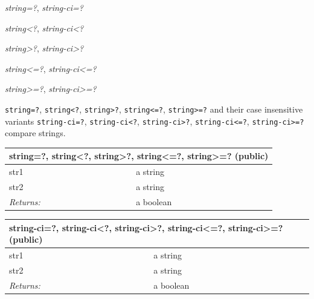 \documentclass[twoside,9pt]{report}
\begin{document}
\emph{string=?}, \emph{string-ci=?}


\emph{string<?}, \emph{string-ci<?}


\emph{string>?}, \emph{string-ci>?}


\emph{string<=?}, \emph{string-ci<=?}


\emph{string>=?}, \emph{string-ci>=?}


\texttt{string=?}, \texttt{string<?}, \texttt{string>?}, \texttt{string<=?}, \texttt{string>=?} and their case insensitive variants \texttt{string-ci=?}, \texttt{string-ci<?}, \texttt{string-ci>?}, \texttt{string-ci<=?}, \texttt{string-ci>=?} compare strings.

\begin{tabular}{ |l l| }
\hline
\multicolumn{2}{|l|}{string=?, string<?, string>?, string<=?, string>=? (public)} \\
\hline
str1 & a string \\
str2 & a string \\
\textit{Returns:} & a boolean \\
\hline
\end{tabular}

\begin{tabular}{ |l l| }
\hline
\multicolumn{2}{|l|}{string-ci=?, string-ci<?, string-ci>?, string-ci<=?, string-ci>=? (public)} \\
\hline
str1 & a string \\
str2 & a string \\
\textit{Returns:} & a boolean \\
\hline
\end{tabular}
\end{document}
